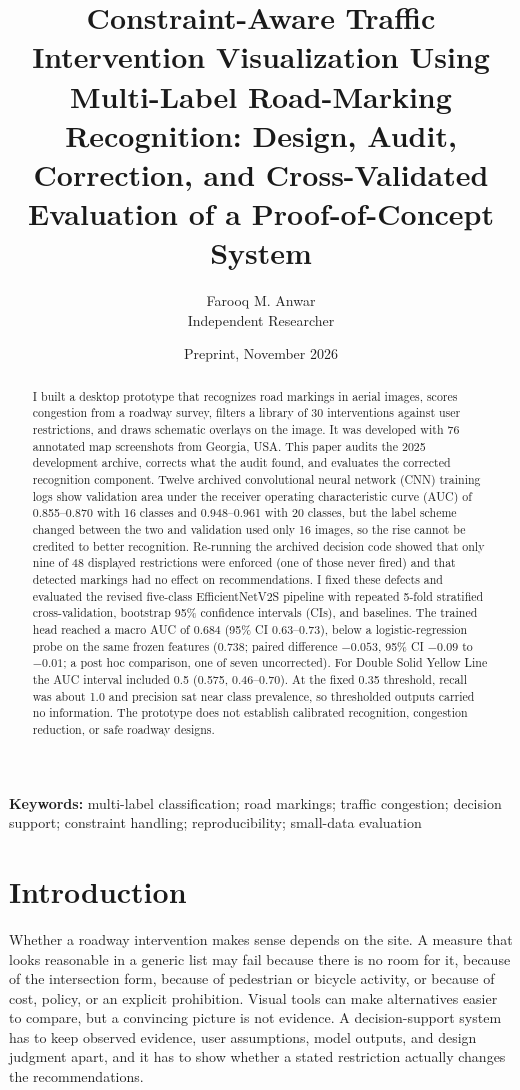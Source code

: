 \documentclass[11pt]{article}
\title{Constraint-Aware Traffic Intervention Visualization Using Multi-Label Road-Marking Recognition: Design, Audit, Correction, and Cross-Validated Evaluation of a Proof-of-Concept System}
\author{Farooq M. Anwar\\\small Independent Researcher}
\date{Preprint, November 2026}
\begin{document}
\maketitle

\begin{abstract}
I built a desktop prototype that recognizes road markings in aerial images, scores congestion from a roadway survey, filters a library of 30 interventions against user restrictions, and draws schematic overlays on the image. It was developed with 76 annotated map screenshots from Georgia, USA. This paper audits the 2025 development archive, corrects what the audit found, and evaluates the corrected recognition component. Twelve archived convolutional neural network (CNN) training logs show validation area under the receiver operating characteristic curve (AUC) of 0.855--0.870 with 16 classes and 0.948--0.961 with 20 classes, but the label scheme changed between the two and validation used only 16 images, so the rise cannot be credited to better recognition. Re-running the archived decision code showed that only nine of 48 displayed restrictions were enforced (one of those never fired) and that detected markings had no effect on recommendations. I fixed these defects and evaluated the revised five-class EfficientNetV2S pipeline with repeated 5-fold stratified cross-validation, bootstrap 95\% confidence intervals (CIs), and baselines. The trained head reached a macro AUC of 0.684 (95\% CI 0.63--0.73), below a logistic-regression probe on the same frozen features (0.738; paired difference $-0.053$, 95\% CI $-0.09$ to $-0.01$; a post hoc comparison, one of seven uncorrected). For Double Solid Yellow Line the AUC interval included 0.5 (0.575, 0.46--0.70). At the fixed 0.35 threshold, recall was about 1.0 and precision sat near class prevalence, so thresholded outputs carried no information. The prototype does not establish calibrated recognition, congestion reduction, or safe roadway designs.
\end{abstract}

\noindent\textbf{Keywords:} multi-label classification; road markings; traffic congestion; decision support; constraint handling; reproducibility; small-data evaluation

\section{Introduction}
Whether a roadway intervention makes sense depends on the site. A measure that looks reasonable in a generic list may fail because there is no room for it, because of the intersection form, because of pedestrian or bicycle activity, or because of cost, policy, or an explicit prohibition. Visual tools can make alternatives easier to compare, but a convincing picture is not evidence. A decision-support system has to keep observed evidence, user assumptions, model outputs, and design judgment apart, and it has to show whether a stated restriction actually changes the recommendations.
\end{document}
